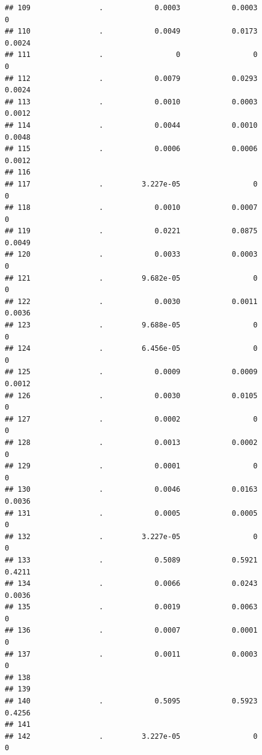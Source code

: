 \documentclass[
]{article}
\begin{document}
\begin{verbatim}
## 109                .            0.0003            0.0003                 0
## 110                .            0.0049            0.0173            0.0024
## 111                .                 0                 0                 0
## 112                .            0.0079            0.0293            0.0024
## 113                .            0.0010            0.0003            0.0012
## 114                .            0.0044            0.0010            0.0048
## 115                .            0.0006            0.0006            0.0012
## 116                                                                       
## 117                .         3.227e-05                 0                 0
## 118                .            0.0010            0.0007                 0
## 119                .            0.0221            0.0875            0.0049
## 120                .            0.0033            0.0003                 0
## 121                .         9.682e-05                 0                 0
## 122                .            0.0030            0.0011            0.0036
## 123                .         9.688e-05                 0                 0
## 124                .         6.456e-05                 0                 0
## 125                .            0.0009            0.0009            0.0012
## 126                .            0.0030            0.0105                 0
## 127                .            0.0002                 0                 0
## 128                .            0.0013            0.0002                 0
## 129                .            0.0001                 0                 0
## 130                .            0.0046            0.0163            0.0036
## 131                .            0.0005            0.0005                 0
## 132                .         3.227e-05                 0                 0
## 133                .            0.5089            0.5921            0.4211
## 134                .            0.0066            0.0243            0.0036
## 135                .            0.0019            0.0063                 0
## 136                .            0.0007            0.0001                 0
## 137                .            0.0011            0.0003                 0
## 138                                                                       
## 139                                                                       
## 140                .            0.5095            0.5923            0.4256
## 141                                                                       
## 142                .         3.227e-05                 0                 0

\end{verbatim}
\end{document}
